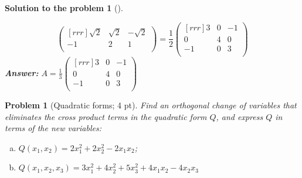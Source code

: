 \documentclass[12pt,a4]{article}
\newtheorem{problem}{Problem}
\newtheorem{solution}{Solution to the problem}
\newcommand{\answer}[1]{\textbf{Answer:} #1}
\begin{document}
{\begin{solution}[]
\begin{enumerate}[(a)]
\[\begin{pmatrix}[rrr]
\sqrt2 & \sqrt2 & -\sqrt2 \\
-1 & 2 & 1 \\
\end{pmatrix}
=
\frac12
\begin{pmatrix}[rrr]
3 & 0 & -1 \\
0 & 4 & 0 \\
-1 & 0 & 3 \\
\end{pmatrix} 
\]
\answer{$A = 
\frac13
\begin{pmatrix}[rrr]
3 & 0 & -1 \\
0 & 4 & 0 \\
-1 & 0 & 3 \\
\end{pmatrix} }$
\end{enumerate}
\end{solution}
}



\begin{problem}[Quadratic forms; 4 pt]\rm
	Find an orthogonal change of variables that eliminates the cross product terms in the quadratic form $Q$, and express $Q$ in terms of the new variables:
	\begin{enumerate}[(a)]
		\item $Q(x_1,x_2)= 2x_1^2 + 2x_2^2 - 2x_1x_2$;
		\item $Q(x_1,x_2,x_3) = 3x_1^2 + 4x_2^2 + 5x_3^2 + 4x_1x_2 -4x_2x_3$
	\end{enumerate}
\end{problem}
\end{document}
